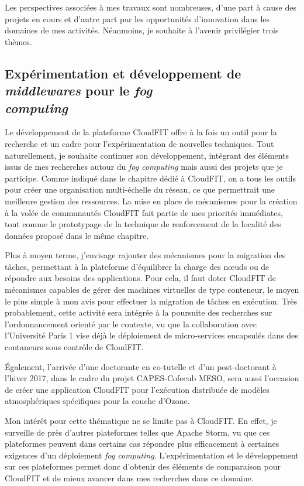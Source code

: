Les perspectives associées à mes travaux sont nombreuses, d'une part à cause des projets en cours et d'autre part par les opportunités d'innovation dans les domaines de mes activités. Néanmoins, je souhaite à l'avenir privilégier trois thèmes.

\subsection*{Expérimentation et développement de \textit{middlewares} pour le \textit{fog \\ computing}}

Le développement de la plateforme CloudFIT offre à la fois un outil pour la recherche et un cadre pour l'expérimentation de nouvelles techniques. Tout naturellement, je souhaite continuer son développement, intégrant des éléments issus de mes recherches autour du \textit{fog computing} mais aussi des projets que je participe. Comme indiqué dans le chapitre dédié à CloudFIT, on a tous les outils pour créer une organisation multi-échelle du réseau, ce que permettrait une meilleure gestion des ressources. La mise en place de mécanismes pour la création à la volée de communautés CloudFIT fait partie de mes priorités immédiates, tout comme le prototypage de la technique de renforcement de la localité des données proposé dans le même chapitre.

Plus à moyen terme, j'envisage rajouter des mécanismes pour la migration des tâches, permettant à la plateforme d'équilibrer la charge des n{\oe}uds ou de répondre aux besoins des applications. Pour cela, il faut doter CloudFIT de mécanismes capables de gérer des machines virtuelles de type conteneur, le moyen le plus simple à mon avis pour effectuer la migration de tâches en exécution. Très probablement, cette activité sera intégrée à la poursuite des recherches sur l'ordonnancement orienté par le contexte, vu que la collaboration avec l'Université Paris 1 vise déjà le déploiement de micro-services encapsulés dans des contaneurs sous contrôle de CloudFIT. 

Également, l'arrivée d'une doctorante en co-tutelle et d'un post-doctorant à l'hiver 2017, dans le cadre du projet CAPES-Cofecub MESO, sera aussi l'occasion de créer une application CloudFIT pour l'exécution distribuée de modèles atmosphériques spécifiques pour la couche d'Ozone.

Mon intérêt pour cette thématique ne se limite pas à CloudFIT. En effet, je surveille de près d'autres plateformes telles que Apache Storm, vu que ces plateformes peuvent dans certains cas répondre plus efficacement à certaines exigences d'un déploiement \textit{fog computing}. L'expérimentation et le développement sur ces plateformes permet donc d'obtenir des éléments de comparaison pour CloudFIT et de mieux avancer dans mes recherches dans ce domaine.



